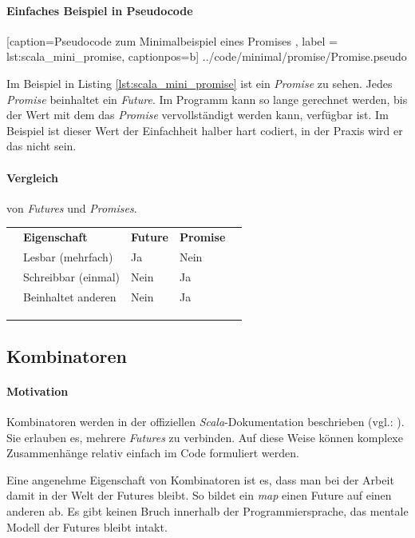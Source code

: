 \paragraph{Einfaches Beispiel in Pseudocode}


    [caption={Pseudocode zum Minimalbeispiel eines Promises },
       label = lst:scala_mini_promise,
       captionpos=b]
 {../code/minimal/promise/Promise.pseudo}
 
Im Beispiel in Listing \ref{lst:scala_mini_promise} ist ein \emph{Promise} zu sehen.
Jedes \emph{Promise} beinhaltet ein \emph{Future}. Im Programm kann
so lange gerechnet werden, bis der Wert mit dem das \emph{Promise}
vervollständigt werden kann, verfügbar ist. Im Beispiel ist dieser
Wert der Einfachheit halber hart codiert, in der Praxis wird er das
nicht sein.

\paragraph{Vergleich} von \emph{Futures} und \emph{Promises}.

\begin{table}[h]
\begin{tabular}{lllll}
 & \textbf{Eigenschaft} & \textbf{Future} & \textbf{Promise} &  \\
 & Lesbar (mehrfach) & Ja & Nein &  \\
 & Schreibbar (einmal) & Nein & Ja &  \\
 & Beinhaltet anderen & Nein & Ja &  \\
 &  &  &  &  \\
 &  &  &  &  \\
 &  &  &  & 
\end{tabular}
\end{table}

\subsection{Kombinatoren}

\paragraph{Motivation} Kombinatoren werden in der offiziellen 
\emph{Scala}-Dokumentation beschrieben (vgl.: \cite{scalaDokuFP}).
Sie erlauben es, mehrere \emph{Futures} zu verbinden. 
Auf diese Weise können komplexe Zusammenhänge relativ einfach
im Code formuliert werden.

Eine angenehme Eigenschaft von Kombinatoren ist es, dass man bei
der Arbeit damit in der Welt der Futures bleibt. So bildet
ein \emph{map} einen Future auf einen anderen ab. Es gibt keinen
Bruch innerhalb der Programmiersprache, das mentale Modell der
Futures bleibt intakt.

